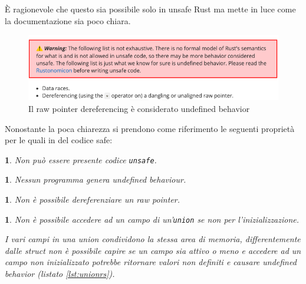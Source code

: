 \documentclass[Lau,binding=0.6cm]{sapthesis}
\newtheorem{lemma}[theorem]{}
\newcommand{\textcode}[1]{\colorbox{backcolour}{\texttt{#1}}}
\begin{document}
È ragionevole che questo sia possibile solo in unsafe Rust ma mette in luce come la documentazione sia poco chiara. 




\begin{figure}[h!t]
    \centering
    \includegraphics[scale=0.52]{images/warning_undefined_behavior.png}
    \caption{Il raw pointer dereferencing è considerato undefined behavior}
    \label{fig:warning}
\end{figure}

Nonostante la poca chiarezza si prendono come riferimento le seguenti proprietà ~\cite[14]{rust:language} per le quali in del codice safe:

\begin{lemma} \label{lemma:unsafe}
	Non può essere presente codice \textnormal{\textcode{unsafe}}.
\end{lemma}

\begin{lemma} \label{lemma:undef_behaviour}
	Nessun programma genera undefined behaviour.
\end{lemma}

\begin{lemma} \label{lemma:raw_pointer}
	Non è possibile dereferenziare un raw pointer.
\end{lemma}

\begin{lemma} \label{lemma:union}
	Non è possibile accedere ad un campo di un'\textnormal{\textcode{union}} se non per l'inizializzazione. 

	\textnormal{I vari campi in una union condividono la stessa area di memoria, differentemente dalle struct non è possibile capire se un campo sia attivo o meno e accedere ad un campo non inizializzato potrebbe ritornare valori non definiti e causare undefined behavior (listato \ref{lst:unionrs}).}
\end{lemma}
\end{document}

